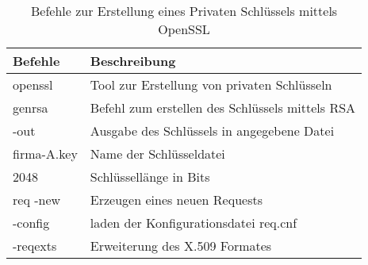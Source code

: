 \begin{table}[h]
	\centering
\begin{tabular}{|l|l|}
	\hline 
	Befehle & Beschreibung \\ 
	\hline 
	openssl & Tool zur Erstellung von privaten Schlüsseln \\ 
	\hline 
	genrsa & Befehl zum erstellen des Schlüssels mittels RSA \\ 
	\hline 
	-out & Ausgabe des Schlüssels in angegebene Datei \\ 
	\hline 
	firma-A.key & Name der Schlüsseldatei \\ 
	\hline 
	2048 & Schlüssellänge in Bits \\ 
	\hline 
	req -new & Erzeugen eines neuen Requests \\ 
	\hline 
	-config & laden der Konfigurationsdatei req.cnf \\ 
	\hline 
	-reqexts & Erweiterung des X.509 Formates \\ 
	\hline 
\end{tabular} 
\caption{Befehle zur Erstellung eines Privaten Schlüssels mittels OpenSSL} \label{tab:openSSLOptionen}
\end{table}

